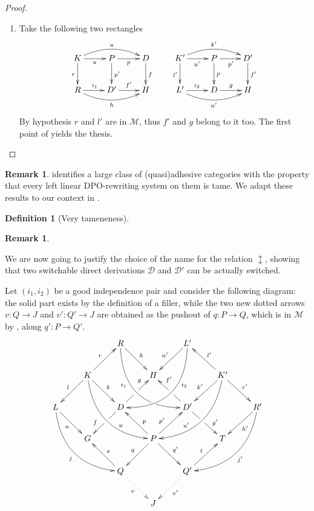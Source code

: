 \documentclass[a4paper]{article}
\newcommand{\dder}[1]{\mathscr{#1}}
\theoremstyle{definition}
\newtheorem{definition}[theorem]{Definition}
\newtheorem{remark}[theorem]{Remark}
\begin{document}
\begin{proof}
\begin{enumerate}
	\item Take the following two rectangles
\[\xymatrix{K \ar@/^.4cm/[rr]^{u}\ar[d]_{r}\ar[r]_{u} &P\ar[d]^{p'} \ar[r]_{p} & D \ar[d]^{f}&K' \ar@/^.4cm/[rr]^{k'}\ar[d]_{l'}\ar[r]_{u'} &P\ar[d]^{p} \ar[r]_{p'} & D' \ar[d]^{f'}\\  R \ar@/_.4cm/[rr]_{h} \ar[r]^{i_1}&D' \ar[r]^{f'} & H&L' \ar@/_.4cm/[rr]_{n'} \ar[r]^{i_2}&D \ar[r]^{g} & H}\]
	By hypothesis $r$ and $l'$ are in $\mathcal{M}$, thus $f'$ and $g$ belong to it too. The first point of   yields the thesis. \qedhere 
\end{enumerate}
\end{proof}

\begin{remark} \cite{baldan2011adhesivity} identifies a large class of (quasi)adhesive categories with the property that every left linear DPO-rewriting system on them is tame. We adapt these results to our context in . 
\end{remark}
\begin{definition}[Very tameneness]
\end{definition}

\begin{remark}
\end{remark}


We are now going to justify the choice of the name for the relation $\updownarrow$, showing that two switchable direct derivations $\dder{D}$ and $\dder{D'}$ can be actually switched. 

Let $(i_1, i_2)$ be a good independence pair and consider the following diagram: the solid part exists by the definition of a filler, while the two new dotted arrows $v\colon Q\to J$ and $v'\colon Q'\to J$ are obtained  as the pushout of $q\colon P\to Q$, which is in $\mathcal{M}$ by , along $q'\colon P\to Q'$.
	\[\xymatrix{&&R \ar@/_1cm/[ddrr]_(.35){i_1}|(.7)\hole \ar[dr]^{h}&& L'\ar@/^1cm/[ddll]^(.35){i_2}  \ar[dl]_{n'}\\&K\ar[dr]^{k}\ar[dl]_{l} \ar@/_.8cm/[ddrr]^(.65){u}\ar[ur]^{r}&& H && K' \ar@/^.8cm/[ddll]_(.65){u'}\ar[dl]_{k'}\ar[lu]_{l'} \ar[dr]^{r'}\\L \ar[dr]_{n} \ar@/_.8cm/[ddrr]_{j}&& D \ar[dl]|(.42)\hole_(.64){f}\ar[ur]|(.48)\hole^(.7){g}&&D' \ar[dr]|(.42)\hole^(.65){g'} \ar[ul]|(.48)\hole_(.7){f'}&&R'\ar@/^.8cm/[ddll]^{j'}\ar[dl]^{h'}\\&G &&P\ar[dr]^{q'} \ar[dl]_{q}\ar[ur]^(.4){p'}\ar[ul]_(.4){p}&&T\\&&Q \ar[ul]_{s}\ar@{.>}[dr]_{v} &&Q'\ar[ur]^{t} \ar@{.>}[dl]^{v'}\\&&&J}\]
	
\end{document}

